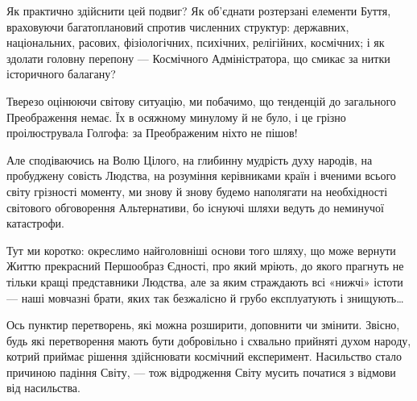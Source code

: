 Як практично здійснити цей подвиг? Як об’єднати розтерзані елементи Буття,
враховуючи багатоплановий спротив численних структур: державних, національних,
расових, фізіологічних, психічних, релігійних, космічних; і як здолати головну
перепону — Космічного Адміністратора, що смикає за нитки історичного балагану?

Тверезо оцінюючи світову ситуацію, ми побачимо, що тенденцій до загального
Преображення немає. Їх в осяжному минулому й не було, і це грізно
проілюструвала Голгофа: за Преображеним ніхто не пішов!

Але сподіваючись на Волю Цілого, на глибинну мудрість духу народів, на
пробуджену совість Людства, на розуміння керівниками країн і вченими всього
світу грізності моменту, ми знову й знову будемо наполягати на необхідності
світового обговорення Альтернативи, бо існуючі шляхи ведуть до неминучої
катастрофи.

Тут ми коротко: окреслимо найголовніші основи того шляху, що може вернути Життю
прекрасний Першообраз Єдності, про який мріють, до якого прагнуть не тільки
кращі представники Людства, але за яким страждають всі «нижчі» істоти — наші
мовчазні брати, яких так безжалісно й грубо експлуатують і знищують…

Ось пунктир перетворень, які можна розширити, доповнити чи змінити. Звісно,
будь які перетворення мають бути добровільно і схвально прийняті духом народу,
котрий приймає рішення здійснювати космічний експеримент. Насильство стало
причиною падіння Світу, — тож відродження Світу мусить початися з відмови від
насильства.

